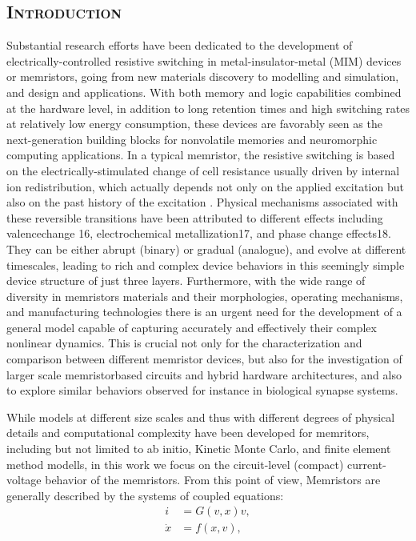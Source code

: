 \documentclass[10pt]{article}
\begin{document}
\begin{multicols}{2}
{\centering %
\section{{\textsc{Introduction}}
}}
Substantial research efforts have been dedicated to the
development of electrically-controlled resistive switching in metal-insulator-metal (MIM) devices or memristors, going from new materials discovery to modelling and simulation, and design and applications.
With both memory and logic capabilities combined at
the hardware level, in addition to long retention times
and high switching rates at relatively low energy
consumption, these devices are favorably seen as the
next-generation building blocks for nonvolatile memories and neuromorphic computing applications. In
a typical memristor, the resistive switching is based on
the electrically-stimulated change of cell resistance usually driven by internal ion redistribution, which actually depends not only on the applied excitation but also
on the past history of the excitation
. Physical mechanisms associated with these reversible transitions have
been attributed to different effects including valencechange 16, electrochemical metallization17, and phase
change effects18. They can be either abrupt (binary)
or gradual (analogue), and evolve at different timescales,
leading to rich and complex device behaviors in this seemingly simple device structure of just three layers. Furthermore, with the wide range of diversity in memristors
materials and their morphologies, operating mechanisms,
and manufacturing technologies there is an urgent need
for the development of a general model capable of capturing accurately and effectively their complex nonlinear
dynamics. This is crucial not only for the characterization and comparison between different memristor devices,
but also for the investigation of larger scale memristorbased circuits and hybrid hardware architectures, and
also to explore similar behaviors observed for instance in
biological synapse systems.
\par
While models at different size scales and thus with different degrees of physical details and computational complexity have been developed for memritors, including but not limited to ab initio, Kinetic Monte Carlo, and finite element method modells, in this work we focus on the circuit-level (compact) current-voltage behavior of the memristors. From this point of view, Memristors are generally described by the systems of coupled equations: 
\begin{align}
     i &= G(v,x)v, \\
     \dot{x} &= f(x,v),
\end{align}


\end{multicols}
\end{document}
